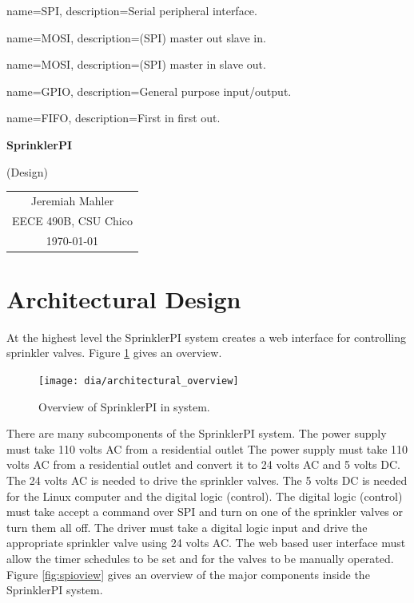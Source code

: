 \documentclass{article}
\begin{document}

{
	name={SPI},
	description={Serial peripheral interface}.
}

{
	name={MOSI},
	description={(SPI) master out slave in}.
}

{
	name={MOSI},
	description={(SPI) master in slave out}.
}

{
	name={GPIO},
	description={General purpose input/output}.
}

{
	name={FIFO},
	description={First in first out}.
}



\vspace*{1.0in}

\centerline{\Large \textbf{SprinklerPI}}
\centerline{(Design)}

\vspace{0.5in}

\begin{center}
\begin{tabular}{c}
Jeremiah Mahler \\
EECE 490B, CSU Chico \\
\today
\end{tabular}
\end{center}

\thispagestyle{empty}

\vfill

\pagebreak

\nocite{rasberrypi}
\thispagestyle{empty}
\tableofcontents

\clearpage
\section{Architectural Design}

At the highest level the SprinklerPI system creates a web interface
for controlling sprinkler valves.
Figure \ref{fig:archoview} gives an overview.

\begin{figure}[h!]
\begin{center}
\texttt{[image: dia/architectural\_overview]}
\end{center}
\caption{Overview of SprinklerPI in system.}
\label{fig:archoview}
\end{figure}

There are many subcomponents of the SprinklerPI system.
The power supply must take 110 volts AC from a residential outlet
The power supply must take 110 volts AC from a residential outlet
and convert it to 24 volts AC and 5 volts DC.
The 24 volts AC is needed to drive the sprinkler valves.
The 5 volts DC is needed for the Linux computer and the digital logic (control).
The digital logic (control) must take accept a command over SPI
and turn on one of the sprinkler valves or turn them all off.
The driver must take a digital logic input and drive the appropriate
sprinkler valve using 24 volts AC.
The web based user interface must allow the timer schedules to be
set and for the valves to be manually operated.
Figure \ref{fig:spioview} gives an overview of the major components
inside the SprinklerPI system.
\end{document}
